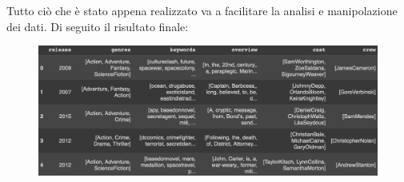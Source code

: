 \documentclass{report}
\begin{document}
        Tutto ciò che è stato appena realizzato va a facilitare la analisi e manipolazione dei dati. Di seguito il risultato finale:
        \begin{figure}[h]
            \centering
            \includegraphics[width=1\linewidth]{screenshot/convert_featurefinal.png}
        \end{figure}
         
\end{document}
